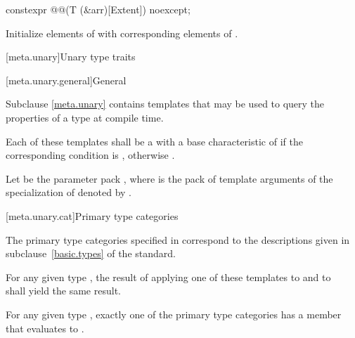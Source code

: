 \begin{itemdecl}
constexpr @@(T (&arr)[Extent]) noexcept;
\end{itemdecl}

\begin{itemdescr}
\pnum
\effects
Initialize elements of  with corresponding elements of .
\end{itemdescr}

[meta.unary]{Unary type traits}

[meta.unary.general]{General}

\pnum
Subclause \ref{meta.unary} contains templates that may be used to query the
properties of a type at compile time.

\pnum
Each of these templates shall be a
with a base characteristic of
 if the corresponding condition is , otherwise
.

\pnum
Let  be the parameter pack
, where  is the pack of
 template arguments of the specialization of
 denoted by
.

[meta.unary.cat]{Primary type categories}

\pnum
The primary type categories specified in 
correspond to the descriptions given in
subclause~\ref{basic.types} of the \Cpp{} standard.

\pnum
For any given type , the result of applying one of these templates to
 and to \cv{}~ shall yield the same result.

\pnum
\begin{note}
For any given type , exactly one of the primary type categories
has a  member that evaluates to .
\end{note}

